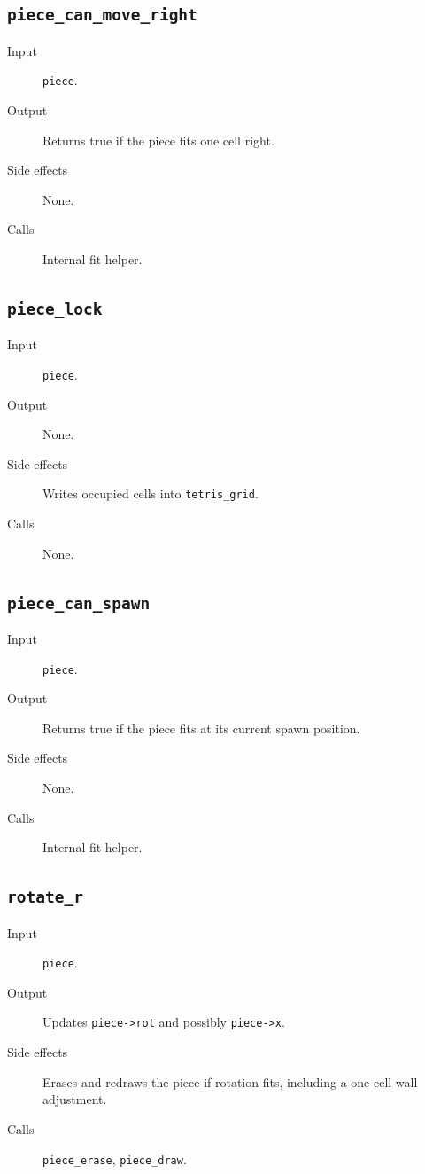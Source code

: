 \subsection*{\texttt{piece\_can\_move\_right}}
\begin{description}
  \item[Input] \texttt{piece}.
  \item[Output] Returns true if the piece fits one cell right.
  \item[Side effects] None.
  \item[Calls] Internal fit helper.
\end{description}

\subsection*{\texttt{piece\_lock}}
\begin{description}
  \item[Input] \texttt{piece}.
  \item[Output] None.
  \item[Side effects] Writes occupied cells into \texttt{tetris\_grid}.
  \item[Calls] None.
\end{description}

\subsection*{\texttt{piece\_can\_spawn}}
\begin{description}
  \item[Input] \texttt{piece}.
  \item[Output] Returns true if the piece fits at its current spawn position.
  \item[Side effects] None.
  \item[Calls] Internal fit helper.
\end{description}

\subsection*{\texttt{rotate\_r}}
\begin{description}
  \item[Input] \texttt{piece}.
  \item[Output] Updates \texttt{piece->rot} and possibly \texttt{piece->x}.
  \item[Side effects] Erases and redraws the piece if rotation fits, including a one-cell wall adjustment.
  \item[Calls] \texttt{piece\_erase}, \texttt{piece\_draw}.
\end{description}

